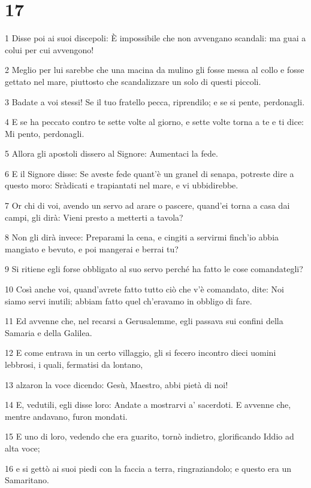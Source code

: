 \chapter{17}

\par 1 Disse poi ai suoi discepoli: È impossibile che non avvengano scandali: ma guai a colui per cui avvengono!
\par 2 Meglio per lui sarebbe che una macina da mulino gli fosse messa al collo e fosse gettato nel mare, piuttosto che scandalizzare un solo di questi piccoli.
\par 3 Badate a voi stessi! Se il tuo fratello pecca, riprendilo; e se si pente, perdonagli.
\par 4 E se ha peccato contro te sette volte al giorno, e sette volte torna a te e ti dice: Mi pento, perdonagli.
\par 5 Allora gli apostoli dissero al Signore: Aumentaci la fede.
\par 6 E il Signore disse: Se aveste fede quant'è un granel di senapa, potreste dire a questo moro: Sràdicati e trapiantati nel mare, e vi ubbidirebbe.
\par 7 Or chi di voi, avendo un servo ad arare o pascere, quand'ei torna a casa dai campi, gli dirà: Vieni presto a metterti a tavola?
\par 8 Non gli dirà invece: Preparami la cena, e cingiti a servirmi finch'io abbia mangiato e bevuto, e poi mangerai e berrai tu?
\par 9 Si ritiene egli forse obbligato al suo servo perché ha fatto le cose comandategli?
\par 10 Così anche voi, quand'avrete fatto tutto ciò che v'è comandato, dite: Noi siamo servi inutili; abbiam fatto quel ch'eravamo in obbligo di fare.
\par 11 Ed avvenne che, nel recarsi a Gerusalemme, egli passava sui confini della Samaria e della Galilea.
\par 12 E come entrava in un certo villaggio, gli si fecero incontro dieci uomini lebbrosi, i quali, fermatisi da lontano,
\par 13 alzaron la voce dicendo: Gesù, Maestro, abbi pietà di noi!
\par 14 E, vedutili, egli disse loro: Andate a mostrarvi a' sacerdoti. E avvenne che, mentre andavano, furon mondati.
\par 15 E uno di loro, vedendo che era guarito, tornò indietro, glorificando Iddio ad alta voce;
\par 16 e si gettò ai suoi piedi con la faccia a terra, ringraziandolo; e questo era un Samaritano.
